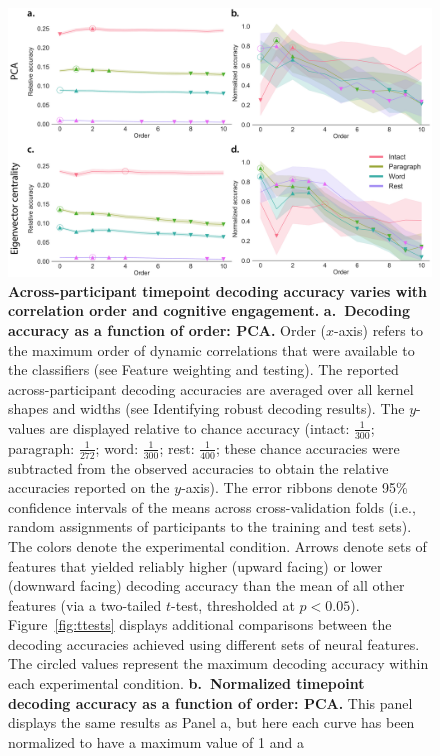 \documentclass[english]{article}
\begin{document}
\begin{figure}[tp]
  \centering
  \includegraphics[width=\textwidth]{figs/decode_level}
  \caption{\textbf{Across-participant timepoint decoding accuracy varies with
       correlation order and cognitive engagement.}
     \textbf{a.~Decoding accuracy as a function of order: PCA.}
    Order ($x$-axis) refers to the maximum order of dynamic
    correlations that were available to the classifiers (see
    Feature weighting and testing).  The reported
    across-participant decoding accuracies are averaged over all
    kernel shapes and widths (see Identifying robust decoding
      results).  The $y$-values are displayed relative to chance
    accuracy (intact: $\frac{1}{300}$; paragraph: $\frac{1}{272}$;
    word: $\frac{1}{300}$; rest: $\frac{1}{400}$; these chance accuracies
    were subtracted from the observed accuracies to obtain the
    relative accuracies reported on the $y$-axis).  The error ribbons
    denote 95\% confidence intervals of the means across cross-validation folds
    (i.e., random assignments of participants to the training and test
    sets).  The colors denote the experimental condition.  Arrows
    denote sets of features that yielded reliably higher (upward
    facing) or lower (downward facing) decoding accuracy than the mean
    of all other features (via a two-tailed $t$-test, thresholded at
    $p < 0.05$).  Figure~\ref{fig:ttests} displays additional
    comparisons between the decoding accuracies achieved using
    different sets of neural features.  The circled values represent
    the maximum decoding accuracy within each experimental condition.
  \textbf{b.~Normalized timepoint decoding accuracy as a function of order:
       PCA.}  This panel displays the same results as Panel a, but here
    each curve has been normalized to have a maximum value of 1 and a
}
\end{figure}
\end{document}
